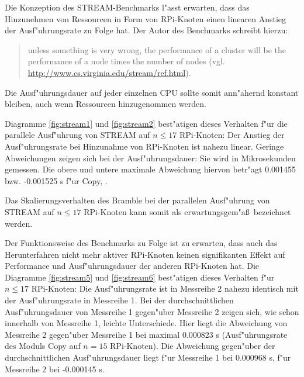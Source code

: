 Die Konzeption des STREAM-Benchmarks l"asst erwarten, dass das Hinzunehmen von Ressourcen in Form von RPi-Knoten einen linearen Anstieg der Ausf"uhrungsrate zu Folge hat. Der Autor des Benchmarks schreibt hierzu: 
\begin{quote}
\onehalfspacing
[\dots] unless something is very wrong, the performance of a cluster will be the performance of a node times the number of nodes (vgl. \url{http://www.cs.virginia.edu/stream/ref.html}).
\end{quote}
Die Ausf"uhrungsdauer auf jeder einzelnen CPU sollte somit ann"ahernd konstant bleiben, auch wenn Ressourcen hinzugenommen werden.

Diagramme \ref{fig:stream1} und \ref{fig:stream2} best"atigen dieses Verhalten f"ur die parallele Ausf"uhrung von STREAM auf $n\leq 17$ RPi-Knoten: Der Anstieg der  Ausf"uhrungsrate bei Hinzunahme von RPi-Knoten ist nahezu linear. Geringe Abweichungen zeigen sich bei der Ausf"uhrungsdauer: Sie wird in Mikrosekunden gemessen. Die obere und untere maximale Abweichung hiervon betr"agt 0.001455 bzw. -0.001525 s f"ur Copy, . %

Das Skalierungsverhalten des Bramble bei der parallelen Ausf"uhrung von STREAM auf $n\leq 17$ RPi-Knoten kann somit als erwartungsgem"a\ss\ bezeichnet werden. 

Der Funktionsweise des Benchmarks zu Folge ist zu erwarten, dass auch das Herunterfahren nicht mehr aktiver RPi-Knoten keinen signifikanten Effekt auf Performance und Ausf"uhrungsdauer der anderen RPi-Knoten hat. Die Diagramme \ref{fig:stream5} und \ref{fig:stream6} best"atigen dieses Verhalten f"ur $n\leq 17$ RPi-Knoten: Die Ausf"uhrungsrate ist in Messreihe 2 nahezu identisch mit der Ausf"uhrungsrate in Messreihe 1. Bei der durchschnittlichen Ausf"uhrungsdauer von Messreihe 1 gegen"uber Messreihe 2 zeigen sich, wie schon innerhalb von Messreihe 1, leichte Unterschiede. Hier liegt die Abweichung von Messreihe 2 gegen"uber Messreihe 1 bei maximal 0.000823 s (Ausf"uhrungsrate des Moduls Copy auf $n=15$ RPi-Knoten). Die Abweichung gegen"uber der durchschnittlichen Ausf"uhrungsdauer liegt f"ur Messreihe 1 bei 0.000968 s, f"ur Messreihe 2 bei -0.000145 s. %

